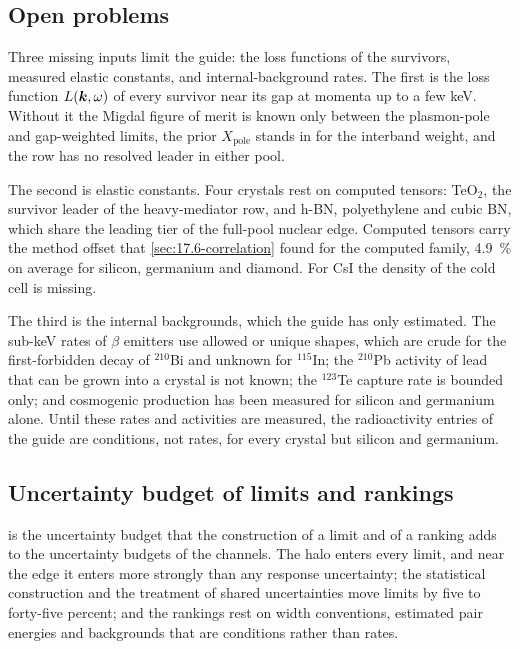 \subsection{Open problems}\label{sec:21.7-open}

Three missing inputs limit the guide: the loss functions of the survivors, measured elastic constants, and internal-background rates. The first is the loss function $L(\bm{k},\omega)$ of every survivor near its gap at momenta up to a few keV. Without it the Migdal figure of merit is known only between the plasmon-pole and gap-weighted limits, the prior $X_{\mathrm{pole}}$ stands in for the interband weight, and the row has no resolved leader in either pool.

The second is elastic constants. Four crystals rest on computed tensors: TeO$_2$, the survivor leader of the heavy-mediator row, and h-BN, polyethylene and cubic BN, which share the leading tier of the full-pool nuclear edge. Computed tensors carry the method offset that \cref{sec:17.6-correlation} found for the computed family, \SI{4.9}{\percent} on average for silicon, germanium and diamond. For CsI the density of the cold cell is missing.

The third is the internal backgrounds, which the guide has only estimated. The sub-keV rates of $\beta$ emitters use allowed or unique shapes, which are crude for the first-forbidden decay of $^{210}$Bi and unknown for $^{115}$In; the $^{210}$Pb activity of lead that can be grown into a crystal is not known; the $^{123}$Te capture rate is bounded only; and cosmogenic production has been measured for silicon and germanium alone. Until these rates and activities are measured, the radioactivity entries of the guide are conditions, not rates, for every crystal but silicon and germanium.

\subsection{Uncertainty budget of limits and rankings}

 is the uncertainty budget that the construction of a limit and of a ranking adds to the uncertainty budgets of the channels. The halo enters every limit, and near the edge it enters more strongly than any response uncertainty; the statistical construction and the treatment of shared uncertainties move limits by five to forty-five percent; and the rankings rest on width conventions, estimated pair energies and backgrounds that are conditions rather than rates.

